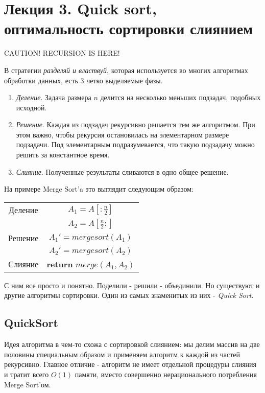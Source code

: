 \documentclass[../book.tex]{subfiles}
\begin{document}
	\section{Лекция 3. Quick sort, оптимальность сортировки слиянием}
	CAUTION! RECURSION IS HERE!
	
	
	В стратегии \textit{разделяй и властвуй}, которая используется во многих алгоритмах обработки данных, есть 3 четко выделяемые фазы.
	\begin{enumerate}
		\item \textit{Деление}. Задача размера $n$ делится на несколько меньших подзадач, подобных исходной.
		
		\item \textit{Решение}. Каждая из подзадач рекурсивно решается тем же алгоритмом. При этом важно, чтобы рекурсия остановилась на элементарном размере подзадачи. Под элементарным подразумевается, что такую подзадачу можно решить за константное время.
		
		\item \textit{Слияние}. Полученные результаты сливаются в одно общее решение.		
	\end{enumerate}
	
	На примере Merge Sort'a это выглядит следующим образом:
	\begin{center}
		\begin{tabular}{c|c}
			Деление &
			$A_1 = A[:\frac{n}{2}]$ \\
			&
			$A_2 = A[\frac{n}{2}:]$
			\\ \hline
			Решение &
			$A_1' = mergesort(A_1)$
			\\
			&
			$A_2' = mergesort(A_2)$
			\\ \hline
			Слияние &
			\textbf{return} $merge(A_1, A_2)$
		\end{tabular}
	\end{center}
	
	С ним все просто и понятно. Поделили - решили - объединили. Но существуют и другие алгоритмы сортировки. Один из самых знаменитых из них - \textit{Quick Sort}.
	
	
	
	\subsection{QuickSort}
	
	Идея алгоритма в чем-то схожа с сортировкой слиянием: мы делим массив на две половины специальным образом и применяем алгоритм к каждой из частей рекурсивно. Главное отличие - алгоритм не имеет отдельной процедуры слияния и тратит всего $O(1)$ памяти, вместо совершенно нерационального потребления Merge Sort'ом.
	
\end{document}
